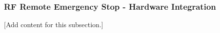 
\subsubsection{RF Remote Emergency Stop - Hardware Integration}
\label{subsubsec:design_8_2_rf_remote_estop}

[Add content for this subsection.]
